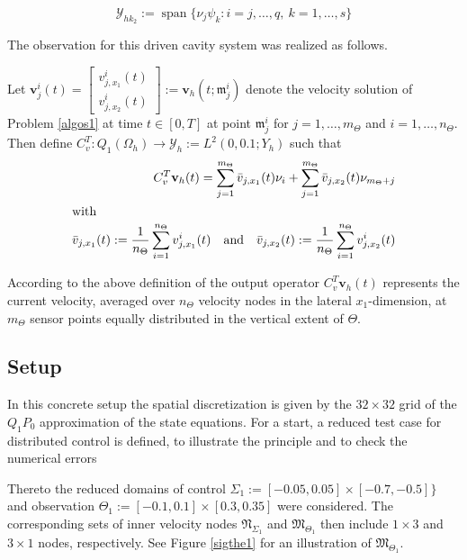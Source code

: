 \documentclass[a4paper,10pt,BCOR=15mm]{scrbook}
\DeclareMathOperator{\spann}{span}
\providecommand{\andi}[0]{\quad \text{and} \quad}
\begin{document}
\begin{equation*}
 \mathcal Y_{hk_2} := \spann \bigl \{ \nu_j\psi_k: i=j,\dotsc,q, ~k=1, \dotsc ,s \bigr \}
\end{equation*}

The observation for this driven cavity system was realized as follows. 

Let $\mathbf v_j^i(t)= \begin{bmatrix} v_{j,x_1}^i(t) \\[.2cm] v_{j,x_2}^i(t)\end{bmatrix} := \mathbf v_h(t;\mathfrak m_j^i)$ denote the velocity solution of Problem \ref{algos1} at time $t \in [0,T]$ at point $\mathfrak m_j^i$ for $j=1,\dotsc,m_\Theta$ and $i=1,\dotsc,n_\Theta$. Then define $C_v^T:Q_1(\Omega_h) \rightarrow \mathcal Y_h:= L^2(0,0.1;Y_h) $ such that
\begin{align*}
 C_v^T\mathbf v_h(t) = \sum _{j=1}^{m_\Theta}\bar v_{j,x_1}(t)\nu_i+ \sum _{j=1}^{m_\Theta}\bar v_{j,x_2}(t)\nu_{m_\Theta+j}\\
\intertext{with}
\bar v_{j,x_1}(t) := \frac{1}{n_\Theta} \sum _{i=1}^{n_\Theta} v_{j,x_1}^i(t) \andi \bar v_{j,x_2}(t) := \frac{1}{n_\Theta} \sum _{i=1}^{n_\Theta} v_{j,x_2}^i(t)
\end{align*}

According to the above definition of the output operator $C_v^T\mathbf v_h(t)$ represents the current velocity, averaged over $n_\Theta$ velocity nodes in the lateral $x_1$-dimension, at $m_\Theta$ sensor points equally distributed in the vertical extent of $\Theta$.

\subsection{Setup}\label{redteca}
In this concrete setup the spatial discretization is given by the $32 \times 32$ grid of the $Q_1P_0$ approximation of the state equations. For a start, a reduced test case for distributed control is defined, to illustrate the principle and to check the numerical errors 

Thereto the reduced domains of control $\Sigma_1 := [-0.05,0.05] \times [-0.7,-0.5] \} $ and observation $\Theta_1 := [-0.1,0.1] \times [0.3,0.35] $ were considered. The corresponding sets of inner velocity nodes $\mathfrak N_{\Sigma_1}$ and $\mathfrak M_{\Theta_1}$ then include $1\times3$ and $3\times1$ nodes, respectively. See Figure \ref{sigthe1} for an illustration of $\mathfrak M_{\Theta_1}$. 
\end{document}
